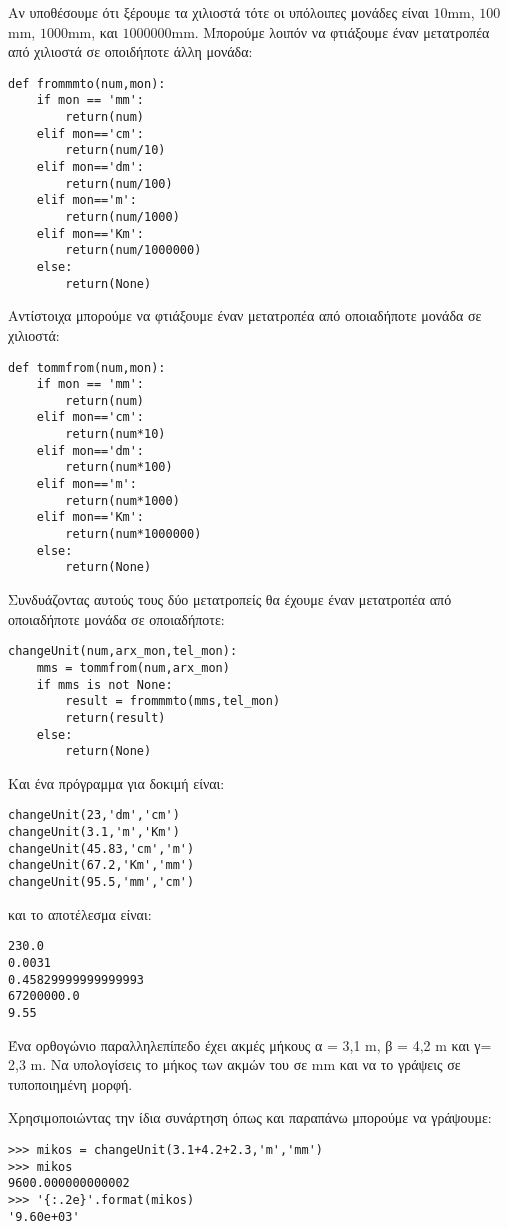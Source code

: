 Αν υποθέσουμε ότι ξέρουμε τα χιλιοστά τότε οι υπόλοιπες μονάδες είναι $10$mm, $100$mm, $1000$mm, και $1000000$mm.
Μπορούμε λοιπόν να φτιάξουμε έναν μετατροπέα από χιλιοστά σε οποιδήποτε άλλη μονάδα:
\begin{lstlisting}
def frommmto(num,mon):
    if mon == 'mm':
        return(num)
    elif mon=='cm':
        return(num/10)
    elif mon=='dm':
        return(num/100)
    elif mon=='m':
        return(num/1000)
    elif mon=='Km':
        return(num/1000000)
    else:
        return(None)
\end{lstlisting}
Αντίστοιχα μπορούμε να φτιάξουμε έναν μετατροπέα από οποιαδήποτε μονάδα σε χιλιοστά:
\begin{lstlisting}
def tommfrom(num,mon):
    if mon == 'mm':
        return(num)
    elif mon=='cm':
        return(num*10)
    elif mon=='dm':
        return(num*100)
    elif mon=='m':
        return(num*1000)
    elif mon=='Km':
        return(num*1000000)
    else:
        return(None)
\end{lstlisting}
Συνδυάζοντας αυτούς τους δύο μετατροπείς θα έχουμε έναν μετατροπέα από οποιαδήποτε μονάδα σε οποιαδήποτε:
\begin{lstlisting}
changeUnit(num,arx_mon,tel_mon):
    mms = tommfrom(num,arx_mon)
    if mms is not None:
        result = frommmto(mms,tel_mon)
        return(result)
    else:
        return(None)
\end{lstlisting}
Και ένα πρόγραμμα για δοκιμή είναι:
\begin{lstlisting}
changeUnit(23,'dm','cm')
changeUnit(3.1,'m','Km')
changeUnit(45.83,'cm','m')
changeUnit(67.2,'Km','mm')
changeUnit(95.5,'mm','cm')
\end{lstlisting}
και το αποτέλεσμα είναι:
\begin{lstlisting}
230.0
0.0031
0.45829999999999993
67200000.0
9.55
\end{lstlisting}
\begin{exercise}
Ένα ορθογώνιο παραλληλεπίπεδο έχει ακμές μήκους α = 3,1 m, β = 4,2 m και γ= 2,3 m. Να υπολογίσεις το μήκος των ακμών του σε mm και να το γράψεις σε τυποποιημένη μορφή.
\end{exercise}
Χρησιμοποιώντας την ίδια συνάρτηση όπως και παραπάνω μπορούμε να γράψουμε:
\begin{lstlisting}
>>> mikos = changeUnit(3.1+4.2+2.3,'m','mm')
>>> mikos
9600.000000000002
>>> '{:.2e}'.format(mikos)
'9.60e+03'
\end{lstlisting}